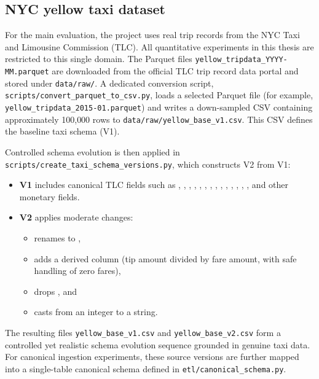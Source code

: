 \subsection{NYC yellow taxi dataset}

For the main evaluation, the project uses real trip records from the NYC Taxi
and Limousine Commission (TLC). All quantitative experiments in this thesis are
restricted to this single domain. The Parquet files
\texttt{yellow\_tripdata\_YYYY-MM.parquet} are downloaded from the official
TLC trip record data portal and stored under \texttt{data/raw/}. A dedicated
conversion script, \texttt{scripts/convert\_parquet\_to\_csv.py}, loads a
selected Parquet file (for example, \texttt{yellow\_tripdata\_2015-01.parquet})
and writes a down-sampled CSV containing approximately 100{,}000 rows to
\texttt{data/raw/yellow\_base\_v1.csv}. This CSV defines the baseline taxi
schema (V1).

Controlled schema evolution is then applied in
\texttt{scripts/create\_taxi\_schema\_versions.py}, which constructs V2
from V1:
%
\begin{itemize}
  \item \textbf{V1} includes canonical TLC fields such as
  , ,
  , ,
  , , ,
  , , ,
  , , ,
  , and other monetary fields.
  \item \textbf{V2} applies moderate changes:
  \begin{itemize}
    \item renames  to ,
    \item adds a derived column  (tip amount divided by
    fare amount, with safe handling of zero fares),
    \item drops , and
    \item casts  from an integer to a string.
  \end{itemize}
\end{itemize}

The resulting files \texttt{yellow\_base\_v1.csv} and
\texttt{yellow\_base\_v2.csv} form a controlled yet realistic schema evolution
sequence grounded in genuine taxi data. For canonical ingestion experiments,
these source versions are further mapped into a single-table canonical schema
defined in \texttt{etl/canonical\_schema.py}.


